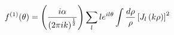 \begin{equation}
f^{\left( 1\right) }(\theta )=\left( \frac{i\alpha }{\left( 2\pi ik\right) ^{%
\frac{1}{2}}}\right) \sum_{l}le^{il\theta }\int \frac{d\rho }{\rho }\left[
J_{l}\left( k\rho \right) \right] ^{2}
\end{equation}

